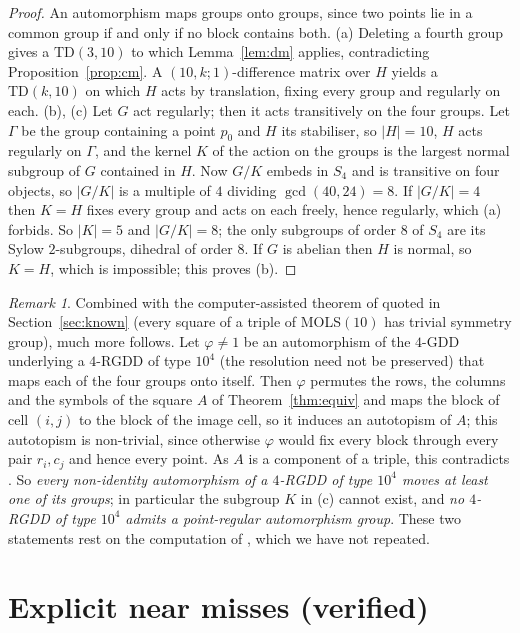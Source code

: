 \documentclass[11pt]{article}
\theoremstyle{remark}
\newtheorem{remark}[theorem]{Remark}
\newcommand{\TD}{\mathrm{TD}}
\begin{document}
\begin{proof}
An automorphism maps groups onto groups, since two points lie in a common group if and
only if no block contains both.
(a) Deleting a fourth group gives a $\TD(3,10)$ to which Lemma~\ref{lem:dm} applies,
contradicting Proposition~\ref{prop:cm}.  A $(10,k;1)$-difference matrix over $H$
yields a $\TD(k,10)$ on which $H$ acts by translation, fixing every group and regularly
on each.
(b), (c) Let $G$ act regularly; then it acts transitively on the four groups.  Let
$\Gamma$ be the group containing a point $p_0$ and $H$ its stabiliser, so $|H|=10$, $H$
acts regularly on $\Gamma$, and the kernel $K$ of the action on the groups is the
largest normal subgroup of $G$ contained in $H$.  Now $G/K$ embeds in $S_4$ and is
transitive on four objects, so $|G/K|$ is a multiple of $4$ dividing $\gcd(40,24)=8$.  If
$|G/K|=4$ then $K=H$ fixes every group and acts on each freely, hence regularly, which
(a) forbids.  So $|K|=5$ and $|G/K|=8$; the only subgroups of order $8$ of $S_4$ are its
Sylow $2$-subgroups, dihedral of order $8$.  If $G$ is abelian then $H$ is normal, so
$K=H$, which is impossible; this proves (b).
\end{proof}

\begin{remark}\label{rem:mmm}
Combined with the computer-assisted theorem of \cite{MMM07} quoted in
Section~\ref{sec:known} (every square of a triple of MOLS$(10)$ has trivial symmetry
group), much more follows.  Let $\varphi\ne 1$ be an automorphism of the $4$-GDD
underlying a $4$-RGDD of type $10^{4}$ (the resolution need not be preserved) that maps
each of the four groups onto itself.  Then $\varphi$ permutes the rows,
the columns and the symbols of the square $A$ of Theorem~\ref{thm:equiv} and maps the
block of cell $(i,j)$ to the block of the image cell, so it induces an autotopism of $A$;
this autotopism is non-trivial, since otherwise $\varphi$ would fix every block through
every pair $r_i,c_j$ and hence every point.  As $A$ is a component of a triple, this
contradicts \cite{MMM07}.  So \emph{every non-identity automorphism of a $4$-RGDD of type
$10^{4}$ moves at least one of its groups}; in particular the subgroup $K$ in (c) cannot
exist, and \emph{no $4$-RGDD of type $10^{4}$ admits a point-regular automorphism group}.
These two statements rest on the computation of \cite{MMM07}, which we have not repeated.
\end{remark}

\section{Explicit near misses (verified)}\label{sec:near}
\end{document}
